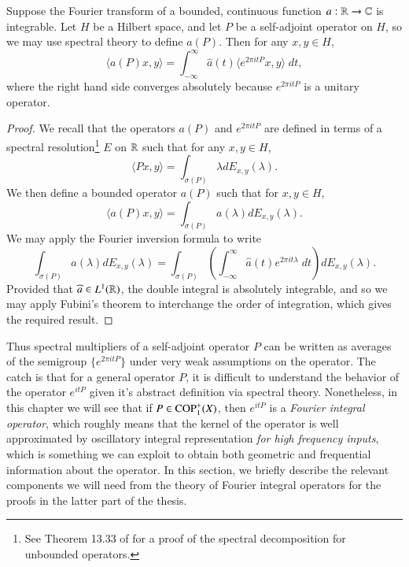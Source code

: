\begin{lemma}
  Suppose the Fourier transform of a bounded, continuous function $a: \operatorname{\mathbb{R}} \to \operatorname{\mathbb{C}}$ is integrable. Let $H$ be a Hilbert space, and let $P$ be a self-adjoint operator on $H$, so we may use spectral theory to define $a(P)$. Then for any $x,y \in H$,
  \[ \langle a(P) x, y \rangle = \int_{-\infty}^\infty \widehat{a}(t) \langle e^{2 \pi i t P} x, y \rangle\; dt, \]
  where the right hand side converges absolutely because $e^{2 \pi i t P}$ is a unitary operator.
\end{lemma}
\begin{proof}
  We recall that the operators $a(P)$ and $e^{2 \pi i t P}$ are defined in terms of a spectral resolution\footnote{See Theorem 13.33 of \cite{RudinFunc} for a proof of the spectral decomposition for unbounded operators.} $E$ on $\operatorname{\mathbb{R}}$ such that for any $x,y \in H$,
  \begin{equation}
    \langle Px, y \rangle = \int_{\sigma(P)} \lambda dE_{x,y}(\lambda).
  \end{equation}
  We then define a bounded operator $a(P)$ such that for $x,y \in H$,
  \begin{equation}
    \langle a(P) x, y \rangle = \int_{\sigma(P)} a(\lambda) dE_{x,y}(\lambda).
  \end{equation}
  We may apply the Fourier inversion formula to write
  \begin{equation}
    \int_{\sigma(P)} a(\lambda) dE_{x,y}(\lambda) = \int_{\sigma(P)} \left( \int_{-\infty}^\infty \widehat{a}(t) e^{2 \pi i t \lambda}\; dt \right) dE_{x,y}(\lambda).
  \end{equation}
%
Provided that $\widehat{a} \in L^1(\operatorname{\mathbb{R}})$, the double integral is absolutely integrable, and so we may apply Fubini's theorem to interchange the order of integration, which gives the required result.
\end{proof}

Thus spectral multipliers of a self-adjoint operator $P$ can be written as averages of the semigroup $\{ e^{2 \pi i t P} \}$ under very weak assumptions on the operator. The catch is that for a general operator $P$, it is difficult to understand the behavior of the operator $e^{i t P}$ given it's abstract definition via spectral theory. Nonetheless, in this chapter we will see that if $P \in {\text{COP}^{+}_{{1}}}(X)$, then $e^{i t P}$ is a \emph{Fourier integral operator}, which roughly means that the kernel of the operator is well approximated by oscillatory integral representation \emph{for high frequency inputs}, which is something we can exploit to obtain both geometric and frequential information about the operator. In this section, we briefly describe the relevant components we will need from the theory of Fourier integral operators for the proofs in the latter part of the thesis.

